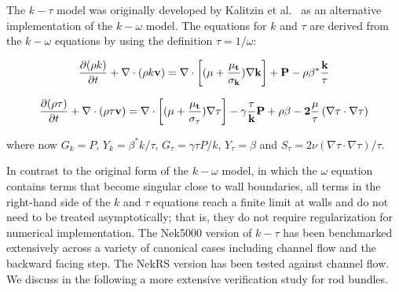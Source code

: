 The $k-\tau$ model was originally developed by Kalitzin et al.~\cite{benton01} as an alternative
implementation of the $k-\omega$ model. The equations for $k$ and $\tau$ are derived from the $k-\omega$
equations by using the definition $\tau=1/\omega$:

\begin{equation}
    \frac{\partial (\rho k)}{\partial t} + \nabla\cdot(\rho k \bf{v}) =  \nabla\cdot\left[(\mu+\frac{\mu_t}{\sigma_k})\nabla k\right] + P-\rho \beta^{*}\frac{k}{\tau}
\end{equation}

\begin{equation}
 \frac{\partial (\rho \tau)}{\partial t} + \nabla\cdot(\rho\tau \bf{v}) =  \nabla\cdot\left[(\mu+\frac{\mu_t}{\sigma_\tau })\nabla \tau \right] - \gamma \frac{\tau}{k} P+\rho \beta-2\frac{\mu}{\tau}\left(\nabla\tau\cdot\nabla\tau\right)
\end{equation}

where now $G_k=P$, $Y_k=\beta^{*}k/\tau$, $G_\tau=\gamma\tau P/k$, $Y_\tau=\beta$ and $S_\tau=2\nu\left(\nabla\tau\cdot\nabla\tau\right)/\tau$.

In contrast to the original form of the $k-\omega$ model, in which the $\omega$ equation contains
terms that become singular close to  wall boundaries, all terms in the right-hand side of the $k$ and $\tau$ equations reach a finite  limit at walls and do not need to be treated  asymptotically; that is, they do not require regularization for numerical implementation. The Nek5000 version of  $k-\tau$ has been benchmarked extensively across a variety of canonical cases including channel flow and the backward facing step. The NekRS version has been tested against channel flow. We discuss in the following a more extensive verification study for rod bundles.

